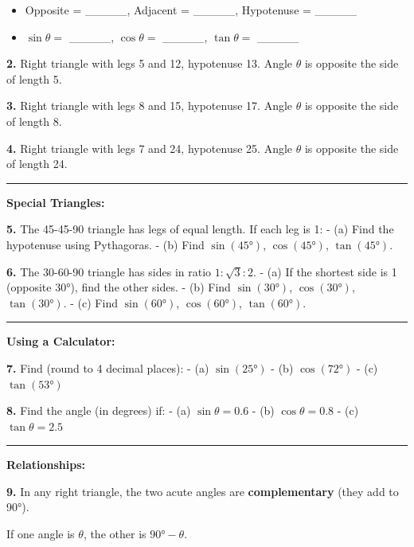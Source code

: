 \documentclass[
  11pt,
]{article}
\providecommand{\tightlist}{%
  \setlength{\itemsep}{0pt}\setlength{\parskip}{0pt}}
\begin{document}
\begin{itemize}
\tightlist
\item
  Opposite = \_\_\_\_\_, Adjacent = \_\_\_\_\_, Hypotenuse = \_\_\_\_\_
\item
  \(\sin\theta ={}\) \_\_\_\_\_, \(\cos\theta ={}\) \_\_\_\_\_,
  \(\tan\theta ={}\) \_\_\_\_\_
\end{itemize}

\textbf{2.} Right triangle with legs 5 and 12, hypotenuse 13. Angle
\(\theta\) is opposite the side of length 5.

\textbf{3.} Right triangle with legs 8 and 15, hypotenuse 17. Angle
\(\theta\) is opposite the side of length 8.

\textbf{4.} Right triangle with legs 7 and 24, hypotenuse 25. Angle
\(\theta\) is opposite the side of length 24.

\begin{center}\rule{0.5\linewidth}{0.5pt}\end{center}

\textbf{Special Triangles:}

\textbf{5.} The 45-45-90 triangle has legs of equal length. If each leg
is 1: - (a) Find the hypotenuse using Pythagoras. - (b) Find
\(\sin(45°)\), \(\cos(45°)\), \(\tan(45°)\).

\textbf{6.} The 30-60-90 triangle has sides in ratio
\(1 : \sqrt{3} : 2\). - (a) If the shortest side is 1 (opposite 30°),
find the other sides. - (b) Find \(\sin(30°)\), \(\cos(30°)\),
\(\tan(30°)\). - (c) Find \(\sin(60°)\), \(\cos(60°)\), \(\tan(60°)\).

\begin{center}\rule{0.5\linewidth}{0.5pt}\end{center}

\textbf{Using a Calculator:}

\textbf{7.} Find (round to 4 decimal places): - (a) \(\sin(25°)\) - (b)
\(\cos(72°)\) - (c) \(\tan(53°)\)

\textbf{8.} Find the angle (in degrees) if: - (a) \(\sin\theta = 0.6\) -
(b) \(\cos\theta = 0.8\) - (c) \(\tan\theta = 2.5\)

\begin{center}\rule{0.5\linewidth}{0.5pt}\end{center}

\textbf{Relationships:}

\textbf{9.} In any right triangle, the two acute angles are
\textbf{complementary} (they add to 90°).

If one angle is \(\theta\), the other is \(90° - \theta\).
\end{document}
